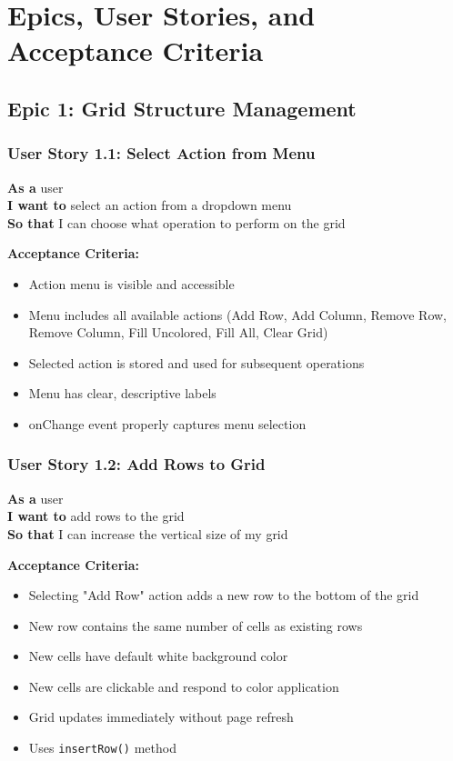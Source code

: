 \documentclass[11pt,a4paper]{article}
\begin{document}
\section{Epics, User Stories, and Acceptance Criteria}

\subsection{Epic 1: Grid Structure Management}

\subsubsection{User Story 1.1: Select Action from Menu}
\textbf{As a} user\\
\textbf{I want to} select an action from a dropdown menu\\
\textbf{So that} I can choose what operation to perform on the grid

\textbf{Acceptance Criteria:}
\begin{itemize}[leftmargin=*]
    \item Action menu is visible and accessible
    \item Menu includes all available actions (Add Row, Add Column, Remove Row, Remove Column, Fill Uncolored, Fill All, Clear Grid)
    \item Selected action is stored and used for subsequent operations
    \item Menu has clear, descriptive labels
    \item onChange event properly captures menu selection
\end{itemize}

\subsubsection{User Story 1.2: Add Rows to Grid}
\textbf{As a} user\\
\textbf{I want to} add rows to the grid\\
\textbf{So that} I can increase the vertical size of my grid

\textbf{Acceptance Criteria:}
\begin{itemize}[leftmargin=*]
    \item Selecting "Add Row" action adds a new row to the bottom of the grid
    \item New row contains the same number of cells as existing rows
    \item New cells have default white background color
    \item New cells are clickable and respond to color application
    \item Grid updates immediately without page refresh
    \item Uses \texttt{insertRow()} method
\end{itemize}
\end{document}
